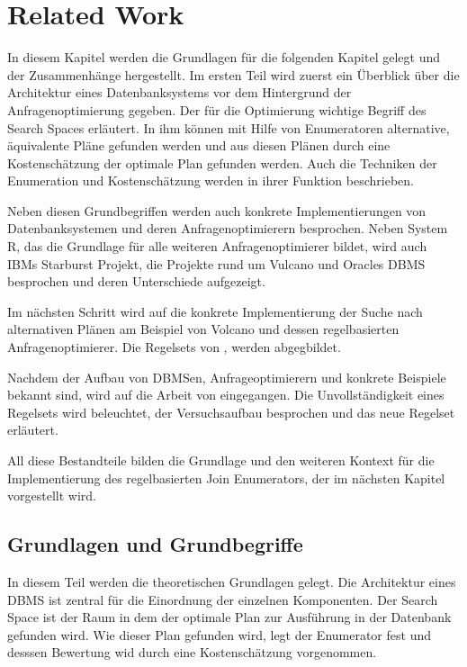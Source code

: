 \chapter{Related Work}


In diesem Kapitel werden die Grundlagen für die folgenden Kapitel gelegt und der Zusammenhänge hergestellt. Im ersten Teil wird zuerst ein Überblick über die Architektur eines Datenbanksystems vor dem Hintergrund der Anfragenoptimierung gegeben. Der für die Optimierung wichtige Begriff des Search Spaces erläutert. In ihm können mit Hilfe von Enumeratoren alternative, äquivalente Pläne gefunden werden und aus diesen Plänen durch eine Kostenschätzung der optimale Plan gefunden werden. Auch die Techniken der Enumeration und Kostenschätzung werden in ihrer Funktion beschrieben.

Neben diesen Grundbegriffen werden auch konkrete Implementierungen von Datenbanksystemen und deren Anfragenoptimierern besprochen. Neben System R, das die Grundlage für alle weiteren Anfragenoptimierer bildet, wird auch IBMs Starburst Projekt, die Projekte rund um Vulcano und Oracles DBMS besprochen und deren Unterschiede aufgezeigt.

Im nächsten Schritt wird auf die konkrete Implementierung der Suche nach alternativen Plänen am Beispiel von Volcano und dessen regelbasierten Anfragenoptimierer. Die Regelsets von \cite{pellenkoft1997complexity}, \cite{pellenkoft1997duplicate} werden abgegbildet.

Nachdem der Aufbau von DBMSen, Anfrageoptimierern und konkrete Beispiele bekannt sind, wird auf die Arbeit von \cite{shanbhag2014optimizing} eingegangen. Die Unvollständigkeit eines Regelsets wird beleuchtet, der Versuchsaufbau besprochen und das neue Regelset erläutert.

All diese Bestandteile bilden die Grundlage und den weiteren Kontext für die Implementierung des regelbasierten Join Enumerators, der im nächsten Kapitel vorgestellt wird.






\section{Grundlagen und Grundbegriffe}

In diesem Teil werden die theoretischen Grundlagen gelegt. Die Architektur eines DBMS ist zentral für die Einordnung der einzelnen Komponenten. Der Search Space ist der Raum in dem der optimale Plan zur Ausführung in der Datenbank gefunden wird. Wie dieser Plan gefunden wird, legt der Enumerator fest und desssen Bewertung wid durch eine Kostenschätzung vorgenommen.




















